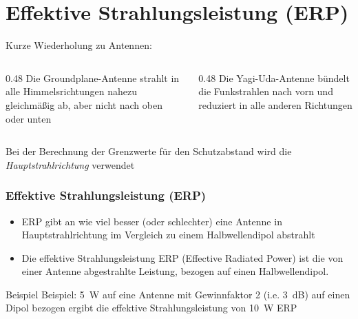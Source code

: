 \section{Effektive Strahlungsleistung (ERP)}
\label{section:effektive_strahlungsleistung_erp_1}
\begin{frame}{Kurze Wiederholung zu Antennen:}
    \begin{columns}
        \begin{column}{0.48\textwidth}
            Die Groundplane-Antenne strahlt in alle Himmelsrichtungen nahezu gleichmäßig ab, aber nicht nach oben oder unten
        \end{column}
        \begin{column}{0.48\textwidth}
            Die Yagi-Uda-Antenne bündelt die Funkstrahlen nach vorn und reduziert in alle anderen Richtungen
        \end{column}
    \end{columns}

    \vspace{10pt}
    Bei der Berechnung der Grenzwerte für den Schutzabstand wird die \emph{Hauptstrahlrichtung} verwendet
\end{frame}

\begin{frame}
    \frametitle{Effektive Strahlungsleistung (ERP)}
    \begin{itemize}
        \item ERP gibt an wie viel besser (oder schlechter) eine Antenne in
        Hauptstrahlrichtung im Vergleich zu einem Halbwellendipol abstrahlt
        \item Die effektive Strahlungsleistung ERP (Effective Radiated Power)
        ist die von einer Antenne abgestrahlte Leistung, bezogen auf einen
        Halbwellendipol.
    \end{itemize}
    \pause
    \begin{exampleblock}{Beispiel}
        Beispiel: 5~W auf eine Antenne mit Gewinnfaktor 2 (i.e. \qty{3}{dB}) auf einen Dipol bezogen ergibt die effektive Strahlungsleistung von 10~W ERP
    \end{exampleblock}
    \pause
\end{frame}

